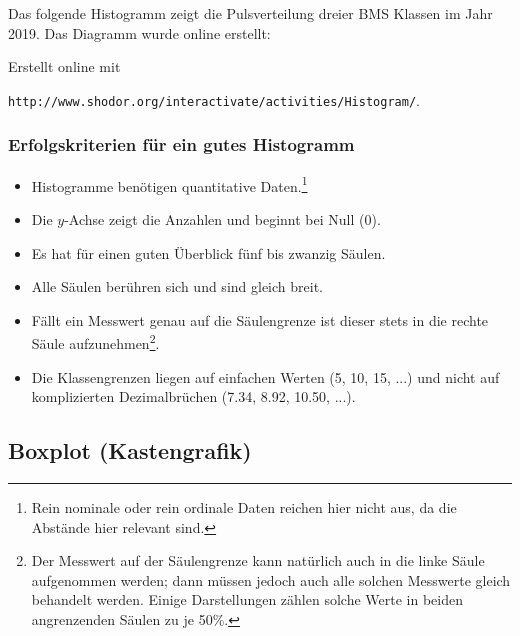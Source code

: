 Das folgende Histogramm zeigt die Pulsverteilung dreier BMS Klassen im Jahr 2019. Das Diagramm wurde online erstellt:


Erstellt online mit

\texttt{http://www.shodor.org/interactivate/activities/Histogram/}.


\subsubsection{Erfolgskriterien für ein gutes Histogramm}
\begin{itemize}
\item Histogramme benötigen quantitative Daten.\footnote{Rein nominale oder rein ordinale Daten reichen hier nicht aus, da die Abstände hier relevant sind.}
\item Die $y$-Achse zeigt die Anzahlen und beginnt bei Null (0).
\item Es hat für einen guten Überblick fünf bis zwanzig Säulen.
\item Alle Säulen berühren sich und sind gleich breit.
\item Fällt ein Messwert genau auf die Säulengrenze ist dieser stets
  in die rechte Säule aufzunehmen\footnote{Der Messwert auf der
    Säulengrenze kann natürlich auch in die linke Säule aufgenommen
    werden; dann müssen jedoch auch alle solchen Messwerte gleich
    behandelt werden. Einige Darstellungen zählen solche Werte in beiden angrenzenden Säulen zu je 50\%.}.
\item Die Klassengrenzen liegen auf einfachen Werten (5, 10, 15, ...)
  und nicht auf komplizierten Dezimalbrüchen (7.34, 8.92, 10.50, ...).
\end{itemize}
\newpage


\newpage

\subsection{Boxplot (Kastengrafik)}

